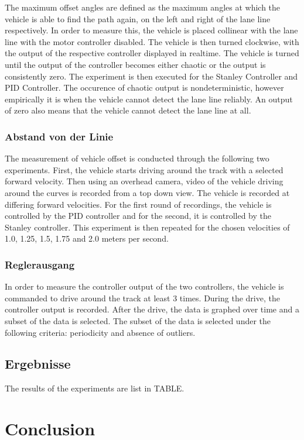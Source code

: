 \documentclass[arbeit=studie,oneside,BCOR=12mm]{ArbeitRST}
\begin{document}
The maximum offset angles are defined as the maximum angles at which the
vehicle is able to find the path again, on the left and right of the lane line
respectively. In order to measure this, the vehicle is placed collinear with
the lane line with the motor controller disabled. The vehicle is then turned
clockwise, with the output of the respective controller displayed in realtime.
The vehicle is turned until the output of the controller becomes either chaotic
or the output is consistently zero. The experiment is then executed for the
Stanley Controller and PID Controller. The occurence of chaotic output is
nondeterministic, however empirically it is when the vehicle cannot detect the
lane line reliably. An output of zero also means that the vehicle cannot detect
the lane line at all.

\subsection{Abstand von der Linie}

The measurement of vehicle offset is conducted through the following two
experiments. First, the vehicle starts driving around the track with a selected
forward velocity. Then using an overhead camera, video of the vehicle driving
around the curves is recorded from a top down view. The vehicle is recorded at
differing forward velocities. For the first round of recordings, the vehicle is
controlled by the PID controller and for the second, it is controlled by the
Stanley controller. This experiment is then repeated for the chosen velocities
of 1.0, 1.25, 1.5, 1.75 and 2.0 meters per second.

\subsection{Reglerausgang}

In order to measure the controller output of the two controllers, the vehicle
is commanded to drive around the track at least 3 times. During the drive, the
controller output is recorded. After the drive, the data is graphed over time
and a subset of the data is selected. The subset of the data is selected under
the following criteria: periodicity and absence of outliers.

\section{Ergebnisse}

The results of the experiments are list in TABLE. 


\chapter{Conclusion}
\end{document}
